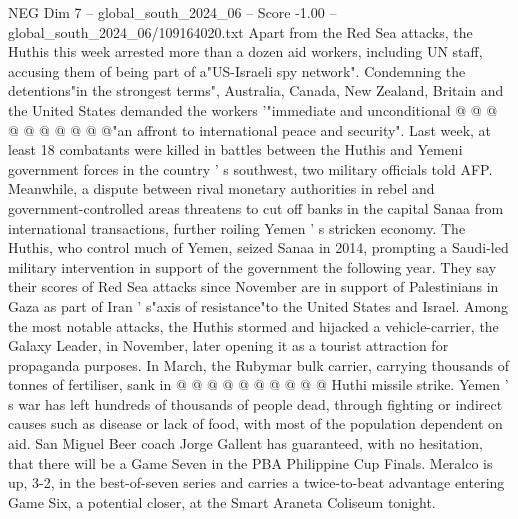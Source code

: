 \begin{textsample}{NEG Dim 7 – global\_south\_2024\_06 – Score -1.00 – global\_south\_2024\_06/109164020.txt}
Apart from the Red Sea attacks, the Huthis this week arrested more than a dozen aid workers, including UN staff, accusing them of being part of a"US-Israeli spy network".
Condemning the detentions"in the strongest terms", Australia, Canada, New Zealand, Britain and the United States demanded the workers '"immediate and unconditional @ @ @ @ @ @ @ @ @ @"an affront to international peace and security".
Last week, at least 18 combatants were killed in battles between the Huthis and Yemeni government forces in the country ' s southwest, two military officials told AFP.
Meanwhile, a dispute between rival monetary authorities in rebel and government-controlled areas threatens to cut off banks in the capital Sanaa from international transactions, further roiling Yemen ' s stricken economy.
The Huthis, who control much of Yemen, seized Sanaa in 2014, prompting a Saudi-led military intervention in support of the government the following year.
They say their scores of Red Sea attacks since November are in support of Palestinians in Gaza as part of Iran ' s"axis of resistance"to the United States and Israel.
Among the most notable attacks, the Huthis stormed and hijacked a vehicle-carrier, the Galaxy Leader, in November, later opening it as a tourist attraction for propaganda purposes.
In March, the Rubymar bulk carrier, carrying thousands of tonnes of fertiliser, sank in @ @ @ @ @ @ @ @ @ @ Huthi missile strike.
Yemen ' s war has left hundreds of thousands of people dead, through fighting or indirect causes such as disease or lack of food, with most of the population dependent on aid.
San Miguel Beer coach Jorge Gallent has guaranteed, with no hesitation, that there will be a Game Seven in the PBA Philippine Cup Finals.
Meralco is up, 3-2, in the best-of-seven series and carries a twice-to-beat advantage entering Game Six, a potential closer, at the Smart Araneta Coliseum tonight.

\end{textsample}

